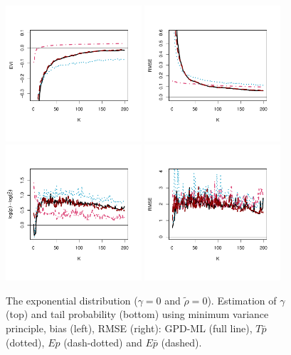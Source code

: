 \begin{figure}[!ht]
 \centering
\includegraphics[width=0.45\textwidth]{./plots/paper3/gammaGPD_evi.pdf} 
\includegraphics[width=0.45\textwidth]{./plots/paper3/gammaGPD_rmse.pdf} \\
\includegraphics[width=0.45\textwidth]{./plots/paper3/gammaGPD_tail.pdf}
\includegraphics[width=0.45\textwidth]{./plots/paper3/gammaGPD_tail_rmse.pdf} 
 \caption{ The exponential distribution ($\gamma=0$ and $\tilde\rho=0$). Estimation of $\gamma$ (top) and tail probability (bottom) using minimum variance principle, bias (left), RMSE (right): GPD-ML (full line), $T\bar{p}$ (dotted), $Ep$ (dash-dotted) and $E\bar{p}$ (dashed).}
\label{paper3:fig7}
\end{figure}


